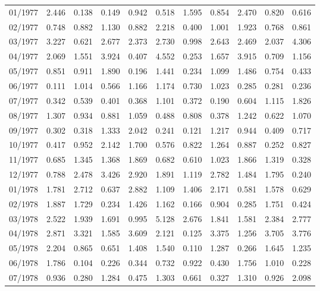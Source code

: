 \begin{tabular}{lrrrrrrrrrr}
01/1977 &  2.446 &  0.138 &  0.149 &  0.942 &  0.518 &  1.595 &  0.854 &  2.470 &  0.820 &  0.616 \\
02/1977 &  0.748 &  0.882 &  1.130 &  0.882 &  2.218 &  0.400 &  1.001 &  1.923 &  0.768 &  0.861 \\
03/1977 &  3.227 &  0.621 &  2.677 &  2.373 &  2.730 &  0.998 &  2.643 &  2.469 &  2.037 &  4.306 \\
04/1977 &  2.069 &  1.551 &  3.924 &  0.407 &  4.552 &  0.253 &  1.657 &  3.915 &  0.709 &  1.156 \\
05/1977 &  0.851 &  0.911 &  1.890 &  0.196 &  1.441 &  0.234 &  1.099 &  1.486 &  0.754 &  0.433 \\
06/1977 &  0.111 &  1.014 &  0.566 &  1.166 &  1.174 &  0.730 &  1.023 &  0.285 &  0.281 &  0.236 \\
07/1977 &  0.342 &  0.539 &  0.401 &  0.368 &  1.101 &  0.372 &  0.190 &  0.604 &  1.115 &  1.826 \\
08/1977 &  1.307 &  0.934 &  0.881 &  1.059 &  0.488 &  0.808 &  0.378 &  1.242 &  0.622 &  1.070 \\
09/1977 &  0.302 &  0.318 &  1.333 &  2.042 &  0.241 &  0.121 &  1.217 &  0.944 &  0.409 &  0.717 \\
10/1977 &  0.417 &  0.952 &  2.142 &  1.700 &  0.576 &  0.822 &  1.264 &  0.887 &  0.252 &  0.827 \\
11/1977 &  0.685 &  1.345 &  1.368 &  1.869 &  0.682 &  0.610 &  1.023 &  1.866 &  1.319 &  0.328 \\
12/1977 &  0.788 &  2.478 &  3.426 &  2.920 &  1.891 &  1.119 &  2.782 &  1.484 &  1.795 &  0.240 \\
01/1978 &  1.781 &  2.712 &  0.637 &  2.882 &  1.109 &  1.406 &  2.171 &  0.581 &  1.578 &  0.629 \\
02/1978 &  1.887 &  1.729 &  0.234 &  1.426 &  1.162 &  0.166 &  0.904 &  0.285 &  1.751 &  0.424 \\
03/1978 &  2.522 &  1.939 &  1.691 &  0.995 &  5.128 &  2.676 &  1.841 &  1.581 &  2.384 &  2.777 \\
04/1978 &  2.871 &  3.321 &  1.585 &  3.609 &  2.121 &  0.125 &  3.375 &  1.256 &  3.705 &  3.776 \\
05/1978 &  2.204 &  0.865 &  0.651 &  1.408 &  1.540 &  0.110 &  1.287 &  0.266 &  1.645 &  1.235 \\
06/1978 &  1.786 &  0.104 &  0.226 &  0.344 &  0.732 &  0.922 &  0.430 &  1.756 &  1.010 &  0.228 \\
07/1978 &  0.936 &  0.280 &  1.284 &  0.475 &  1.303 &  0.661 &  0.327 &  1.310 &  0.926 &  2.098 \\

\end{tabular}
